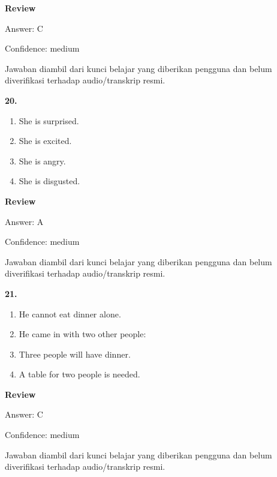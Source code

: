 \documentclass[12pt]{article}
\begin{document}
\par
\begingroup
\setlength{\parskip}{0pt}
\setlength{\parindent}{0pt}
\textbf{Review}\par
Answer: C\par
Confidence: medium\par
Jawaban diambil dari kunci belajar yang diberikan pengguna dan belum diverifikasi terhadap audio/transkrip resmi.\par
\endgroup
\par
\vspace{0.25\baselineskip}
\noindent\textbf{20.}
\begin{enumerate}[label=(\Alph*),leftmargin=*,itemsep=0.2em]
\item She is surprised.
\item She is excited.
\item She is angry.
\item She is disgusted.
\end{enumerate}
\par
\begingroup
\setlength{\parskip}{0pt}
\setlength{\parindent}{0pt}
\textbf{Review}\par
Answer: A\par
Confidence: medium\par
Jawaban diambil dari kunci belajar yang diberikan pengguna dan belum diverifikasi terhadap audio/transkrip resmi.\par
\endgroup
\par
\vspace{0.25\baselineskip}
\noindent\textbf{21.}
\begin{enumerate}[label=(\Alph*),leftmargin=*,itemsep=0.2em]
\item He cannot eat dinner alone.
\item He came in with two other people:
\item Three people will have dinner.
\item A table for two people is needed.
\end{enumerate}
\par
\begingroup
\setlength{\parskip}{0pt}
\setlength{\parindent}{0pt}
\textbf{Review}\par
Answer: C\par
Confidence: medium\par
Jawaban diambil dari kunci belajar yang diberikan pengguna dan belum diverifikasi terhadap audio/transkrip resmi.\par
\endgroup
\par
\vspace{0.25\baselineskip}
\end{document}
